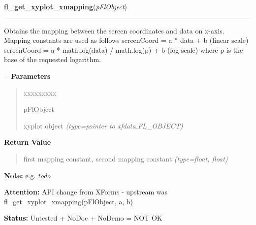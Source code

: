     \label{xformslib:flxyplot:fl_get_xyplot_xmapping}

    \vspace{0.5ex}

\hspace{.8\funcindent}\begin{boxedminipage}{\funcwidth}

    \raggedright \textbf{fl\_get\_xyplot\_xmapping}(\textit{pFlObject})

    \vspace{-1.5ex}

    \rule{\textwidth}{0.5\fboxrule}
\setlength{\parskip}{2ex}

Obtains the mapping between the screen coordinates and data on x-axis.
Mapping constants are used as follows
screenCoord = a * data + b       (linear scale)
screenCoord = a * math.log(data) / math.log(p) + b (log scale)
where p is the base of the requested logarithm.

-{}-
\setlength{\parskip}{1ex}
      \textbf{Parameters}
      \vspace{-1ex}

      \begin{quote}
        \begin{Ventry}{xxxxxxxxx}

          \item[pFlObject]


xyplot object
            {\it (type=pointer to xfdata.FL\_OBJECT)}

        \end{Ventry}

      \end{quote}

      \textbf{Return Value}
    \vspace{-1ex}

      \begin{quote}

first mapping constant, second mapping constant
      {\it (type=float, float)}

      \end{quote}

\textbf{Note:} 
e.g. \emph{todo}


\textbf{Attention:} 
API change from XForms - upstream was
fl\_get\_xyplot\_xmapping(pFlObject, a, b)


\textbf{Status:} 
Untested + NoDoc + NoDemo = NOT OK


    \end{boxedminipage}

